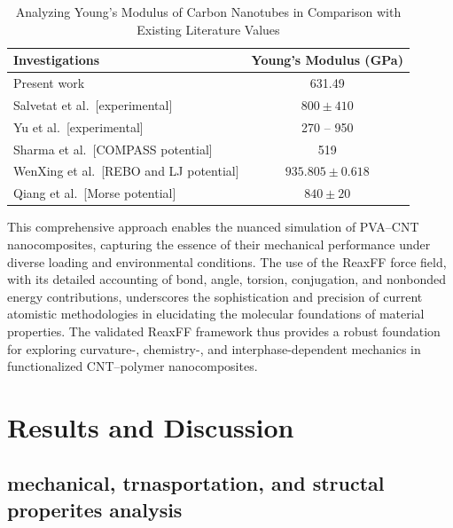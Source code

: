 \documentclass[journal=jacsat,manuscript=article]{achemso}
\begin{document}
\begin{table}[htbp]
\centering
\caption{Analyzing Young’s Modulus of Carbon Nanotubes in Comparison with Existing Literature Values}
\begin{tabular}{l c}
\hline
\textbf{Investigations} & \textbf{Young’s Modulus (GPa)} \\
\hline
Present work & 631.49 \\
Salvetat et al.\ [experimental]\cite{salvetat1999elastic} & $800 \pm 410$ \\
Yu et al.\ [experimental]\cite{yu2000strength} & 270 -- 950 \\
Sharma et al.\ [COMPASS potential]\cite{sharma2013molecular} & 519 \\
WenXing et al.\ [REBO and LJ potential]\cite{wenxing2004simulation} & $935.805 \pm 0.618$ \\
Qiang et al.\ [Morse potential]\cite{lu2005effect} & $840 \pm 20$ \\
\hline
\end{tabular}
\label{tab:youngs_modulus_comparison}

\end{table}

This comprehensive approach enables the nuanced simulation of PVA–CNT nanocomposites, capturing the essence of their mechanical performance under diverse loading and environmental conditions. The use of the ReaxFF force field, with its detailed accounting of bond, angle, torsion, conjugation, and nonbonded energy contributions, underscores the sophistication and precision of current atomistic methodologies in elucidating the molecular foundations of material properties. The validated ReaxFF framework thus provides a robust foundation for exploring curvature-, chemistry-, and interphase-dependent mechanics in functionalized CNT–polymer nanocomposites.











\section{Results and Discussion}

\subsection{mechanical, trnasportation, and structal properites analysis}
\end{document}
